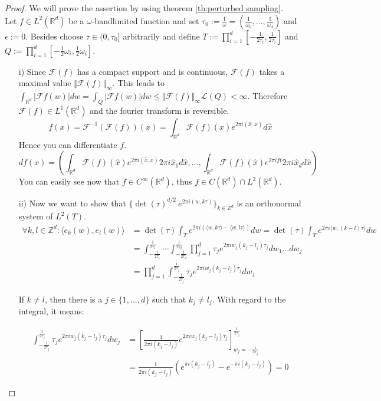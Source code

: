 \documentclass[a4paper, 11pt]{scrreprt}
\newcommand{\RR}{\mathbb{R}}
\newcommand{\ZZ}{\mathbb{Z}}
\newcommand{\FF}{\mathcal{F}}
\begin{document}
\begin{proof}[Proof]
We will prove the assertion by using theorem \ref{th:perturbed sampling}.\\ Let $f \in L^2(\RR^d)$ be a $\omega$-bandlimited function and set $\tau_0 := \frac{1}{\omega} = \left(\frac{1}{\omega_0}, \ldots, \frac{1}{\omega_d}\right)$ and $\epsilon := 0$. Besides choose $\tau \in (0,\tau_0]$ arbitrarily and define $T := \prod_{i=1}^d \left[-\frac{1}{2\tau_i} ,\frac{1}{2\tau_i}\right]$ and $Q := \prod_{i=1}^d \left[-\frac{1}{2}\omega_i ,\frac{1}{2}\omega_i\right]$.
\begin{itemize}
\item[i)] Since \(\FF(f)\) has a compact support and is continuous, $\FF(f)$ takes a maximal value $\Vert \FF(f) \Vert_\infty$. This leads to $\int_{\RR^d}| \FF f(w)|dw = \int_Q| \FF f(w)| dw \leq \Vert \FF(f) \Vert_\infty \mathscr{L}(Q) < \infty$. Therefore $\FF(f) \in L^1(\RR^d)$ and the fourier transform is reversible.
	 \[f(x) = \FF^{-1}(\FF(f))(x) = \int_{\RR^d}\FF(f)(\hat{x}) e^{2 \pi i (\hat{x},x)} d\hat{x}\]
	 Hence you can differentiate $f$.
	 \[df(x) = \left(\int_{\RR^d} \FF(f)(\hat{x}) e^{2 \pi i (\hat{x},x)} 2 \pi i \hat{x}_1 d\hat{x}, \ldots, \int_{\RR^d} \FF(f)(\hat{x}) e^{2 \pi i f t} 2 \pi i \hat{x}_d d\hat{x} \right)\]
	 You can easily see now that \(f \in C^\infty(\RR^d)\), thus $f \in C(\RR^d) \cap L^2(\RR^d)$.
\item[ii)] Now we want to show that $\{\det(\tau)^{d/2}\ e^{2 \pi i (w,k \tau)}\}_{k \in \ZZ^d}$ is an orthonormal system of $L^2(T)$.
\begin{align*}
\forall k,l \in \ZZ^d: \langle e_k(w), e_l(w) \rangle 
&= \det(\tau) \int_{T} e^{2 \pi i (\langle w,k \tau \rangle- \langle w,l \tau \rangle )}dw
= \det(\tau) \int_{T} e^{2 \pi i \langle w,(k-l) \tau \rangle}dw \\
&= \int_{-\frac{1}{2\tau_1}}^{\frac{1}{2\tau_1}} \cdots \int_{-\frac{1}{2\tau_d}}^{\frac{1}{2\tau_d}} \prod_{j=1}^d \tau_j e^{2 \pi i w_j (k_j-l_j) \tau_j}dw_1 \ldots dw_j \\
&= \prod_{j=1}^d \int_{-\frac{1}{2\tau_j}}^{\frac{1}{2\tau_j}} \tau_j e^{2 \pi i w_j (k_j-l_j) \tau_j}dw_j
\end{align*}

If $k \neq l$, then there is a $j \in \{1,\ldots,d\}$ such that $k_j \neq l_j$. With regard to the integral, it means:

\begin{align*}
\int_{-\frac{1}{2\tau_j}}^{\frac{1}{2\tau_j}} \tau_j e^{2 \pi i w_j (k_j-l_j) \tau_j}dw_j
&= \left[ \frac{1}{2 \pi i (k_j - l_j)} e^{2 \pi i w_j (k_j-l_j) \tau_j} \right]_{w_j = -\frac{1}{2 \tau_j}}^{\frac{1}{2 \tau_j}} \\
&= \frac{1}{2 \pi i (k_j-l_j)} \left( e^{\pi i (k_j-l_j)} - e^{-\pi i (k_j-l_j)} \right) = 0
\end{align*}


\end{itemize}
\end{proof}
\end{document}
